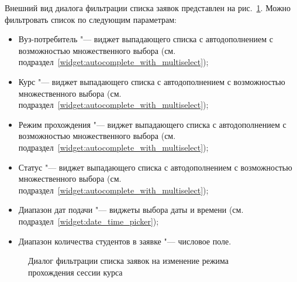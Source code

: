 Внешний вид диалога фильтрации списка заявок представлен на рис.~\ref{img:agreement:change_mode_req_list_filter}.
Можно фильтровать список по следующим параметрам:
\begin{itemize}
	\item Вуз-потребитель "--- виджет выпадающего списка с автодополнением с возможностью множественного выбора 
	(см. подраздел~\ref{widget:autocomplete_with_multiselect});
	\item Курс "--- виджет выпадающего списка с автодополнением с возможностью множественного выбора 
	(см. подраздел~\ref{widget:autocomplete_with_multiselect});
	\item Режим прохождения "--- виджет выпадающего списка с автодополнением с возможностью множественного выбора 
	(см. подраздел~\ref{widget:autocomplete_with_multiselect});
	\item Статус "--- виджет выпадающего списка с автодополнением с возможностью множественного выбора 
	(см. подраздел~\ref{widget:autocomplete_with_multiselect});
	\item Диапазон дат подачи "--- виджеты выбора даты и времени 
	(см. подраздел~\ref{widget:date_time_picker});
	\item Диапазон количества студентов в заявке "--- числовое поле.
\end{itemize}

\begin{figure}[H]
	\caption{Диалог фильтрации списка заявок на изменение режима прохождения сессии курса}
	\label{img:agreement:change_mode_req_list_filter}
\end{figure}


